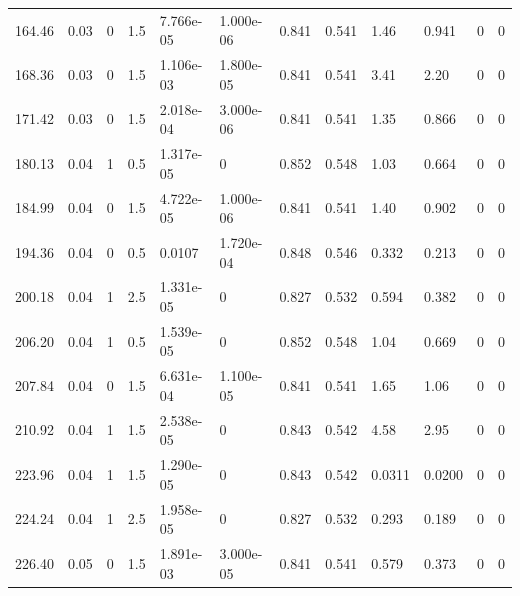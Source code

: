 \documentclass[preview]{standalone}
\begin{document}
{{\begin{tabular}{L{1.2cm}C{1.2cm} C{0.3cm}C{0.5cm} C{1.4cm}C{1.4cm} C{1.4cm}C{1.4cm} C{1.6cm}C{1.6cm} C{1.6cm}C{1.6cm}}
  164.46  &  0.03  & 0     & 1.5 &  7.766e-05  & 1.000e-06  &  0.841&   0.541& 1.46 & 0.941   &  0 & 0  \\ 
  168.36  &  0.03  & 0     & 1.5 &  1.106e-03  & 1.800e-05  &  0.841&   0.541& 3.41 & 2.20   &  0 & 0  \\ 
  171.42  &  0.03  & 0     & 1.5 &  2.018e-04  & 3.000e-06  &  0.841&   0.541& 1.35 & 0.866   &  0 & 0  \\ 
  180.13  &  0.04  & 1     & 0.5 &  1.317e-05  & 0  &  0.852&   0.548& 1.03 & 0.664   &  0 & 0  \\ 
  184.99  &  0.04  & 0     & 1.5 &  4.722e-05  & 1.000e-06  &  0.841&   0.541& 1.40 & 0.902   &  0 & 0  \\ 
  194.36  &  0.04  & 0     & 0.5 &  0.0107  & 1.720e-04  &  0.848&   0.546& 0.332 & 0.213   &  0 & 0  \\ 
  200.18  &  0.04  & 1     & 2.5 &  1.331e-05  & 0  &  0.827&   0.532& 0.594 & 0.382   &  0 & 0  \\ 
  206.20  &  0.04  & 1     & 0.5 &  1.539e-05  & 0  &  0.852&   0.548& 1.04 & 0.669   &  0 & 0  \\ 
  207.84  &  0.04  & 0     & 1.5 &  6.631e-04  & 1.100e-05  &  0.841&   0.541& 1.65 & 1.06   &  0 & 0  \\ 
  210.92  &  0.04  & 1     & 1.5 &  2.538e-05  & 0  &  0.843&   0.542& 4.58 & 2.95   &  0 & 0  \\ 
  223.96  &  0.04  & 1     & 1.5 &  1.290e-05  & 0  &  0.843&   0.542& 0.0311 & 0.0200   &  0 & 0  \\ 
  224.24  &  0.04  & 1     & 2.5 &  1.958e-05  & 0  &  0.827&   0.532& 0.293 & 0.189   &  0 & 0  \\ 
  226.40  &  0.05  & 0     & 1.5 &  1.891e-03  & 3.000e-05  &  0.841&   0.541& 0.579 & 0.373   &  0 & 0  \\ 
\hline 
\end{tabular} 

}}
\end{document}
